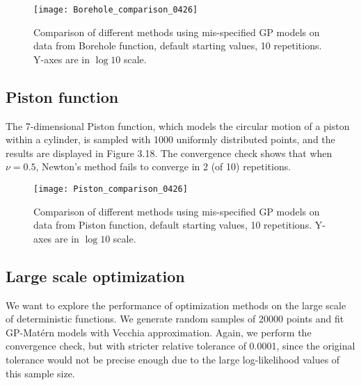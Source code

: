 \begin{figure}[hbt!]%
  \centering
  \texttt{[image: Borehole\_comparison\_0426]} %
  \caption[Times of Borehole function: line graphs with range bars]%
  {Comparison of different methods using mis-specified GP models on data from Borehole function, default starting values, 10 repetitions. Y-axes are in $\log 10$ scale.}%
  \label{fig:plotset}
\end{figure}

\subsection{Piston function}

The 7-dimensional Piston function, which models the circular motion of a piston within a cylinder, is sampled with 1000 uniformly distributed points, and the results are displayed in Figure 3.18. The convergence check shows that when $\nu=0.5$, Newton's method fails to converge in 2 (of 10) repetitions. 

\begin{figure}[hbt!]%
  \centering
  \texttt{[image: Piston\_comparison\_0426]} %
  \caption[Times of Piston function: line graphs with range bars]%
  {Comparison of different methods using mis-specified GP models on data from Piston function, default starting values, 10 repetitions. Y-axes are in $\log 10$ scale.}%
  \label{fig:plotset}
\end{figure}

\subsection{Large scale optimization}

We want to explore the performance of optimization methods on the large scale of deterministic functions. We generate random samples of 20000 points and fit GP-Mat\'ern models with Vecchia approximation. Again, we perform the convergence check, but with stricter relative tolerance of 0.0001, since the original tolerance would not be precise enough due to the large log-likelihood values of this sample size. 

